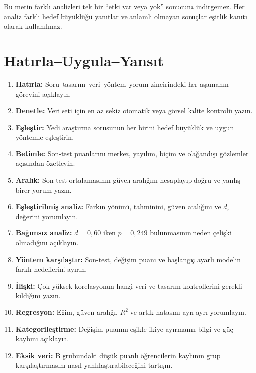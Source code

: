 Bu metin farklı analizleri tek bir ``etki var veya yok'' sonucuna indirgemez.
Her analiz farklı hedef büyüklüğü yanıtlar ve anlamlı olmayan sonuçlar eşitlik
kanıtı olarak kullanılmaz.




\section*{Hatırla--Uygula--Yansıt}

\begin{enumerate}
\renewcommand{\labelenumi}{\textbf{\Alph{enumi}.}}
  \item \textbf{Hatırla:} Soru--tasarım--veri--yöntem--yorum zincirindeki her aşamanın görevini açıklayın.
  \item \textbf{Denetle:} Veri seti için en az sekiz otomatik veya görsel kalite kontrolü yazın.
  \item \textbf{Eşleştir:} Yedi araştırma sorusunun her birini hedef büyüklük ve uygun yöntemle eşleştirin.
  \item \textbf{Betimle:} Son-test puanlarını merkez, yayılım, biçim ve olağandışı gözlemler açısından özetleyin.
  \item \textbf{Aralık:} Son-test ortalamasının güven aralığını hesaplayıp doğru ve yanlış birer yorum yazın.
  \item \textbf{Eşleştirilmiş analiz:} Farkın yönünü, tahminini, güven aralığını ve $d_z$ değerini yorumlayın.
  \item \textbf{Bağımsız analiz:} $d=0{,}60$ iken $p=0{,}249$ bulunmasının neden çelişki olmadığını açıklayın.
  \item \textbf{Yöntem karşılaştır:} Son-test, değişim puanı ve başlangıç ayarlı modelin farklı hedeflerini ayırın.
  \item \textbf{İlişki:} Çok yüksek korelasyonun hangi veri ve tasarım kontrollerini gerekli kıldığını yazın.
  \item \textbf{Regresyon:} Eğim, güven aralığı, $R^2$ ve artık hatasını ayrı ayrı yorumlayın.
  \item \textbf{Kategorileştirme:} Değişim puanını eşikle ikiye ayırmanın bilgi ve güç kaybını açıklayın.
  \item \textbf{Eksik veri:} B grubundaki düşük puanlı öğrencilerin kaybının grup karşılaştırmasını nasıl yanlılaştırabileceğini tartışın.

\end{enumerate}
